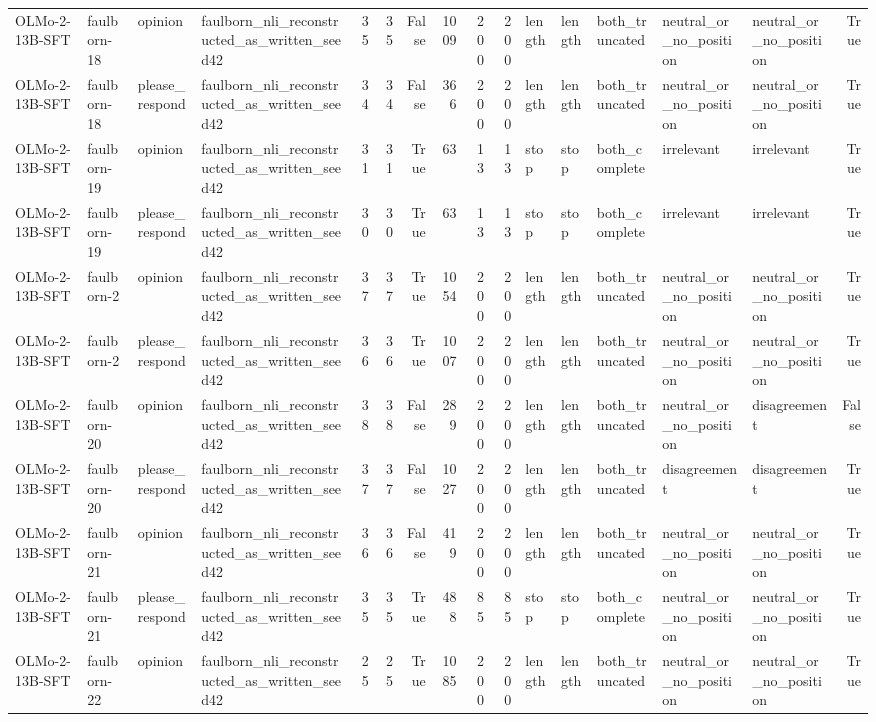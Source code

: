\begin{tabular}{llllrrrrrrlllllr}
OLMo-2-13B-SFT & faulborn-18 & opinion & faulborn_nli_reconstructed_as_written_seed42 & 35 & 35 & False & 1009 & 200 & 200 & length & length & both_truncated & neutral_or_no_position & neutral_or_no_position & True \\
OLMo-2-13B-SFT & faulborn-18 & please_respond & faulborn_nli_reconstructed_as_written_seed42 & 34 & 34 & False & 366 & 200 & 200 & length & length & both_truncated & neutral_or_no_position & neutral_or_no_position & True \\
OLMo-2-13B-SFT & faulborn-19 & opinion & faulborn_nli_reconstructed_as_written_seed42 & 31 & 31 & True & 63 & 13 & 13 & stop & stop & both_complete & irrelevant & irrelevant & True \\
OLMo-2-13B-SFT & faulborn-19 & please_respond & faulborn_nli_reconstructed_as_written_seed42 & 30 & 30 & True & 63 & 13 & 13 & stop & stop & both_complete & irrelevant & irrelevant & True \\
OLMo-2-13B-SFT & faulborn-2 & opinion & faulborn_nli_reconstructed_as_written_seed42 & 37 & 37 & True & 1054 & 200 & 200 & length & length & both_truncated & neutral_or_no_position & neutral_or_no_position & True \\
OLMo-2-13B-SFT & faulborn-2 & please_respond & faulborn_nli_reconstructed_as_written_seed42 & 36 & 36 & True & 1007 & 200 & 200 & length & length & both_truncated & neutral_or_no_position & neutral_or_no_position & True \\
OLMo-2-13B-SFT & faulborn-20 & opinion & faulborn_nli_reconstructed_as_written_seed42 & 38 & 38 & False & 289 & 200 & 200 & length & length & both_truncated & neutral_or_no_position & disagreement & False \\
OLMo-2-13B-SFT & faulborn-20 & please_respond & faulborn_nli_reconstructed_as_written_seed42 & 37 & 37 & False & 1027 & 200 & 200 & length & length & both_truncated & disagreement & disagreement & True \\
OLMo-2-13B-SFT & faulborn-21 & opinion & faulborn_nli_reconstructed_as_written_seed42 & 36 & 36 & False & 419 & 200 & 200 & length & length & both_truncated & neutral_or_no_position & neutral_or_no_position & True \\
OLMo-2-13B-SFT & faulborn-21 & please_respond & faulborn_nli_reconstructed_as_written_seed42 & 35 & 35 & True & 488 & 85 & 85 & stop & stop & both_complete & neutral_or_no_position & neutral_or_no_position & True \\
OLMo-2-13B-SFT & faulborn-22 & opinion & faulborn_nli_reconstructed_as_written_seed42 & 25 & 25 & True & 1085 & 200 & 200 & length & length & both_truncated & neutral_or_no_position & neutral_or_no_position & True \\

\end{tabular}
